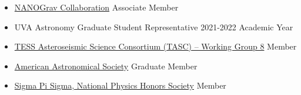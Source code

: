 \documentclass[letterpaper,12pt]{article}
\begin{document}
\vspace{-2mm}
\begin{itemize}
    \item \href{http://nanograv.org/}{NANOGrav Collaboration} \hfill Associate Member\vspace{-3mm}
    \item UVA Astronomy Graduate Student Representative \hfill 2021-2022 Academic Year\vspace{-3mm}
    \item \href{https://tasoc.dk/info/tasc.php}{TESS Asteroseismic Science Consortium (TASC) -- Working Group 8} \hfill Member\vspace{-3mm}
    \item \href{https://aas.org/}{American Astronomical Society} \hfill Graduate Member\vspace{-3mm}
    \item \href{https://www.sigmapisigma.org/sigmapisigma}{Sigma Pi Sigma, National Physics Honors Society} \hfill Member\vspace{-1mm}
\end{itemize}

\vspace{3mm}
\noindent{}
\end{document}
